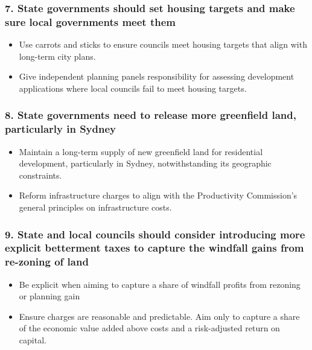 \documentclass[FrontPage]{grattan}
\begin{document}
\subsubsection{7. State governments should set housing targets and make sure local governments meet them}
\begin{itemize}
\item Use carrots and sticks to ensure councils meet housing targets that align with long-term city plans.
\item Give independent planning panels responsibility for assessing development applications where local councils fail to meet housing targets.
\end{itemize}
\eject
\null
\vspace*{-0.6\baselineskip}  
\subsubsection{8. State governments need to release more greenfield land, particularly in Sydney}
\begin{itemize}
\item Maintain a long-term supply of new greenfield land for residential development, particularly in Sydney, notwithstanding its geographic constraints.
\item Reform infrastructure charges to align with the Productivity Commission’s general principles on infrastructure costs.
\end{itemize}

\subsubsection{9. State and local councils should consider introducing more explicit betterment taxes to capture the windfall gains from re-zoning of land}
\begin{itemize}
\item Be explicit when aiming to capture a share of windfall profits from rezoning or planning gain
\item Ensure charges are reasonable and predictable.
Aim only to capture a share of the economic value added above costs and a risk-adjusted return on capital.
\end{itemize}


\end{document}
